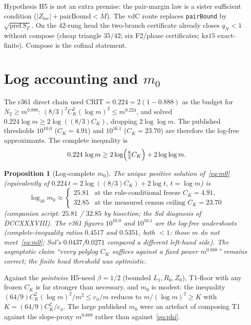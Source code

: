 \documentclass[11pt]{article}
\newtheorem{prop}{Proposition}
\theoremstyle{remark}
\newcommand{\pref}{\mathrm{pref}}
\newcommand{\loc}{\mathrm{loc}}
\begin{document}
Hypothesis H5 is not an extra premise: the pair-margin law is a
sister sufficient condition ($|Z_{\loc}|+\mathrm{pairBound}<M$).
The vdC route replaces \texttt{pairBound} by
$\sqrt{\pref\,S_F}$.  On the $42$-rung head the two-branch
certificate already closes $q_N<1$ without compose (cheap
triangle $35/42$; six F2/phase certificates; kz$15$
exact-finite).  Compose is the cofinal statement.

\section{Log accounting and $m_0$}\label{sec:m0}

The r361 direct chain used $\mathrm{CRIT}=0.224=2(1-0.888)$ as
the budget for $N_2\ge m^{0.888}$:
$(8/3)^2 C_K^2(\log m)^2\le m^{0.224}$, and solved
$0.224\log m\ge 2\log((8/3)C_K)$, dropping $2\log\log m$.
The published thresholds $10^{10.0}$ ($C_K=4.91$) and
$10^{16.1}$ ($C_K=23.70$) are therefore the log-free
approximants.  The complete inequality is
\begin{equation}\label{eq:m0}
  0.224\,\log m
  \ge
  2\log\Bigl(\tfrac83 C_K\Bigr)+2\log\log m.
\end{equation}

\begin{prop}[Log-complete \texorpdfstring{$m_0$}{m0}]\label{prop:m0}
The unique positive solution of~\eqref{eq:m0} (equivalently
of $0.224\,t=2\log((8/3)C_K)+2\log t$, $t=\log m$) is
\[
  \log_{10} m_0
  \approx
  \begin{cases}
    25.81 & \text{at the rule-conditional freeze }C_K=4.91,\\
    32.85 & \text{at the measured census ceiling }C_K=23.70
  \end{cases}
\]
(companion script: $25.81$ / $32.85$ by bisection; the Sol
diagnosis of DCCXXXVIII).
The r361 figures $10^{10.0}$ and $10^{16.1}$ are the
log-free undershoots (complete-inequality ratios $0.4517$ and
$0.5351$, both $<1$: those $m$ do \emph{not} meet~\eqref{eq:m0};
Sol's $0.0437$/$0.0271$ compared a different left-hand side).  The
asymptotic claim ``every polylog $C_K$ suffices against a
fixed power $m^{0.888}$'' remains correct; the finite head
threshold was optimistic.
\end{prop}

\noindent
Against the \emph{pointwise} H5-need $\beta=1/2$ (bounded
$L_1,R_0,Z_0$), T1-floor with any frozen $C_K$ is far stronger
than necessary, and $m_0$ is modest: the inequality
$(64/9)C_K^2(\log m)^2/m^2\le c_\phi/m$ reduces to
$m/(\log m)^2\ge K$ with $K=(64/9)C_K^2/c_\phi$.  The large
published $m_0$ were an artefact of composing T1 against the
slope-proxy $m^{0.888}$ rather than against~\eqref{eq:phi}.
\end{document}
